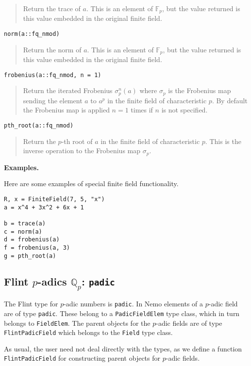 \documentclass[a4paper,10pt]{article}
\newcommand{\Q}{\mathbb{Q}}
\newcommand{\F}{\mathbb{F}}
\newcommand{\code}{\lstinline}
\newcommand{\desc}[1]{\vspace{-3mm}\begin{quote}#1\end{quote}}
\begin{document}
{{\desc{Return the trace of $a$. This is an element of $\F_p$, but the value
returned is this value embedded in the original finite field.}

\begin{lstlisting}
norm(a::fq_nmod)
\end{lstlisting}

\desc{Return the norm of $a$. This is an element of $\F_p$, but the value
returned is this value embedded in the original finite field.}

\begin{lstlisting}
frobenius(a::fq_nmod, n = 1)
\end{lstlisting}

\desc{Return the iterated Frobenius $\sigma_p^n(a)$ where $\sigma_p$ is the 
Frobenius map sending the element $a$ to $a^p$ in the finite field of 
characteristic $p$. By default the Frobenius map is applied $n = 1$ times if
$n$ is not specified.}

\begin{lstlisting}
pth_root(a::fq_nmod)
\end{lstlisting}

\desc{Return the $p$-th root of $a$ in the finite field of characteristic
$p$. This is the inverse operation to the Frobenius map $\sigma_p$.}

\textbf{Examples.}

Here are some examples of special finite field functionality.

\begin{lstlisting}
R, x = FiniteField(7, 5, "x")
a = x^4 + 3x^2 + 6x + 1

b = trace(a)
c = norm(a)
d = frobenius(a)
f = frobenius(a, 3)
g = pth_root(a)
\end{lstlisting}

\subsection{Flint $p$-adics $\Q_p$: \code{padic}}

The Flint type for $p$-adic numbers is \code{padic}. In Nemo elements of a
$p$-adic field are of type \code{padic}. These belong to a \code{PadicFieldElem}
type class, which in turn belongs to \code{FieldElem}. The parent objects for 
the $p$-adic fields are of type \code{FlintPadicField} which belongs to the
\code{Field} type class.

As usual, the user need not deal directly with the types, as we define a function
\code{FlintPadicField} for constructing parent objects for $p$-adic fields.

}}
\end{document}
